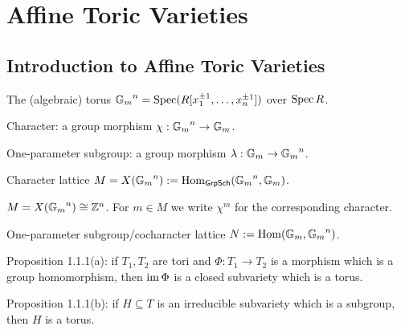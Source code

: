 \section{Affine Toric Varieties}

\subsection{Introduction to Affine Toric Varieties}

\begin{definition}
  \label{torusOver}
  \leanok
  The (algebraic) torus ${\mathbb G_m}^n = \operatorname{Spec}(R[x_1^{\pm 1}, \dotsc, x_n^{\pm 1}])$ over $\operatorname{Spec} R$.
\end{definition}

\begin{definition}
  \label{char}
  Character: a group morphism $\chi : {\mathbb G_m}^n \to {\mathbb G_m}$.
\end{definition}

\begin{definition}
  \label{one_ps}
  One-parameter subgroup: a group morphism $\lambda : {\mathbb G_m} \to {\mathbb G_m}^n$.
\end{definition}

\begin{definition}
  \label{char_lattice}
  Character lattice $M = X({\mathbb G_m}^n) := \operatorname{Hom}_{\mathsf{GrpSch}}({\mathbb G_m}^n, {\mathbb G_m})$.
\end{definition}

\begin{proposition}
  \label{charTor}
  $M = X({\mathbb G_m}^n) \cong {\mathbb Z}^n$. For $m \in M$ we write $\chi^m$ for the corresponding character.
\end{proposition}

\begin{definition}
  \label{ops_lattice}
  One-parameter subgroup/cocharacter lattice $N := \operatorname{Hom}({\mathbb G_m}, {\mathbb G_m}^n)$.
\end{definition}

\begin{proposition}
  \label{prop:1.1.1.a}
  Proposition 1.1.1(a): if $T_1, T_2$ are tori and $\Phi : T_1 \to T_2$ is a morphism which is a group homomorphism, then $\operatorname{im} \Phi$ is a closed subvariety which is a torus.
\end{proposition}

\begin{proposition}
  \label{prop:1.1.1.b}
  Proposition 1.1.1(b): if $H \subseteq T$ is an irreducible subvariety which is a subgroup, then $H$ is a torus.
\end{proposition}

